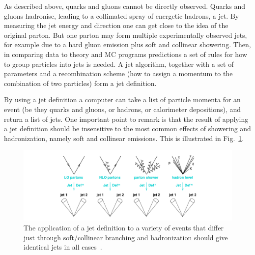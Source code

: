 
As described above, quarks and gluons cannot be directly observed. %
Quarks and gluons hadronise, leading to a collimated spray of energetic hadrons, a jet. By measuring the jet energy and direction one can get close to the idea of the original parton. But one parton may form multiple experimentally observed jets, for example due to a hard gluon emission plus soft and collinear showering. Then, in comparing data to theory and MC programs predictions a set of rules for how to group particles into jets is needed. A jet algorithm, together with a set of parameters and a recombination scheme (how to assign a momentum to the combination of two particles) form a jet definition.

By using a jet definition a computer can take a list of particle momenta for an event (be they quarks and gluons, or hadrons, or calorimeter depositions), and return a list of jets. One important point to remark is that the result of applying a jet definition should be insensitive to the most common effects of showering and hadronization, namely soft and collinear emissions. This is illustrated in Fig.~\ref{fig:jetdefinition}.

\begin{figure}[htbp]
  \begin{center}
      \includegraphics[width=1\textwidth]{Fig2/jetdefinition.png}
    \caption{The application of a jet definition to a variety of events that differ just through soft/collinear branching and hadronization should give identical jets in all cases~\cite{GavinLectures}.}
    \label{fig:jetdefinition}
  \end{center}
\end{figure}

